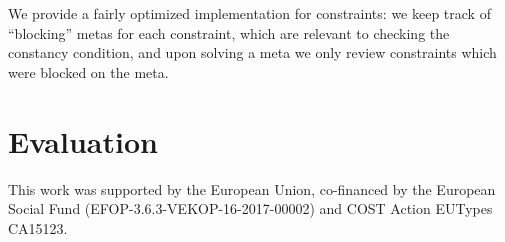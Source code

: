 \documentclass[acmsmall,review,anonymous,prologue,dvipsnames]{acmart}\settopmatter{printfolios=true,printccs=false,printacmref=false}
\theoremstyle{remark}
\begin{document}
We provide a fairly optimized implementation for constraints: we keep track of
``blocking'' metas for each constraint, which are relevant to checking the
constancy condition, and upon solving a meta we only review constraints which
were blocked on the meta.

\section{Evaluation}
\label{sec:impl_and_eval}







\begin{acks}
  This work was supported by the European Union, co-financed by the
  European Social Fund (EFOP-3.6.3-VEKOP-16-2017-00002) and COST Action
  EUTypes CA15123.
\end{acks}


\end{document}
